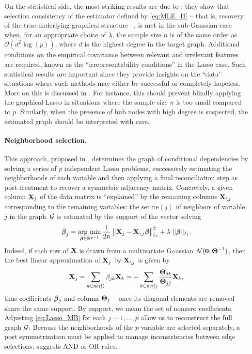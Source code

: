 On  the  statistical  side,  the  most striking  results  are  due  to
\cite{2011_EJS_Ravikumar}: they show that selection consistency of the
estimator defined  by \eqref{eq:MLE_l1}  -- that  is, recovery  of the
true underlying  graphical structure  --, is  met in  the sub-Gaussian
case when, for an appropriate choice of $\lambda$, the sample size $n$
is of the  same order as $\mathcal{O}(d^2 \log(p))$, where  $d$ is the
highest  degree in  the target  graph.  Additional  conditions on  the
empirical  covariance between  relevant  and  irrelevant features  are
required, known as the  ``irrepresentability conditions'' in the Lasso
case.   Such  statistical results  are  important  since they  provide
insights on the  ``data'' situations where such methods  may either be
successful  or completely  hopeless.   More on  this  is discussed  in
\cite{2012_EJS_Verzelen}.  For  instance, this should  prevent blindly
applying the graphical-Lasso  in situations where the  sample size $n$
is too  small compared to  $p$.  Similarly,  when the presence  of hub
nodes with  high degree  is suspected, the  estimated graph  should be
interpreted with care.

\paragraph*{Neighborhood  selection.}   This   approach,  proposed  in
\cite{2006_AS_Meinshausen},  determines   the  graph   of  conditional
dependencies by  solving a series  of $p$ independent  Lasso problems,
successively estimating  the neighborhoods  of each variable  and then
applying a  final reconciliation step  as post-treatment to  recover a
symmetric adjacency matrix.  Concretely, a given column $\mathbf{X}_j$ of the
data matrix is ``explained'' by the remaining columns $\mathbf{X}_{\backslash
  j}$ corresponding to the remaining variables: the set $\text{ne}(j)$
of neighbors of variable~$j$ in the graph~$\mathcal{G}$ is estimated by the
support of the vector solving
\begin{equation}
  \label{eq:Lasso_MB}
  \,\hat{\!\boldsymbol\beta}_j = \mathop{\mathrm{arg\ min}}_{\boldsymbol\beta\in\mathbb{R}^{p-1}}     \frac{1}{2n}\left\|
    \mathbf{X}_j   -   \mathbf{X}_{\backslash   j}   \boldsymbol\beta
  \right\|_{\ell_2}^2 + \lambda\ \|\boldsymbol\beta\|_{\ell_1}.
\end{equation}
Indeed, if  each row of  $\mathbf{X}$ is  drawn from a  multivariate Gaussian
$\mathcal{N}(\mathbf{0},\boldsymbol\Theta^{-1})$, then  the best  linear approximation
of $\mathbf{X}_j$ by  $\mathbf{X}_{\backslash j}$ is given by
\begin{equation}
  \label{eq:lincoef2invcov}
  \mathbf{X}_j = \sum_{k \in \text{ne(j)}} \beta_{jk} \mathbf{X}_k = - \sum_{k \in \text{ne(j)}} \frac{\boldsymbol\Theta_{jk}}{\boldsymbol\Theta_{jj}} \mathbf{X}_{k},
\end{equation}
thus  coefficients  $\boldsymbol\beta_j$  and  column $\boldsymbol\Theta_j$  --  once  its
diagonal elements are  removed -- share the same  support. By support,
we    mean   the    set    of    nonzero   coefficients.     Adjusting
\eqref{eq:Lasso_MB} for each $j=1,\dots,p$ allow us to reconstruct the
full graph $\mathcal{G}$. Because the neighborhoods of the $p$ variable are
selected separately, a  post symmetrization must be  applied to manage
inconsistencies  between  edge selections;  \cite{2006_AS_Meinshausen}
suggests AND or OR rules.

